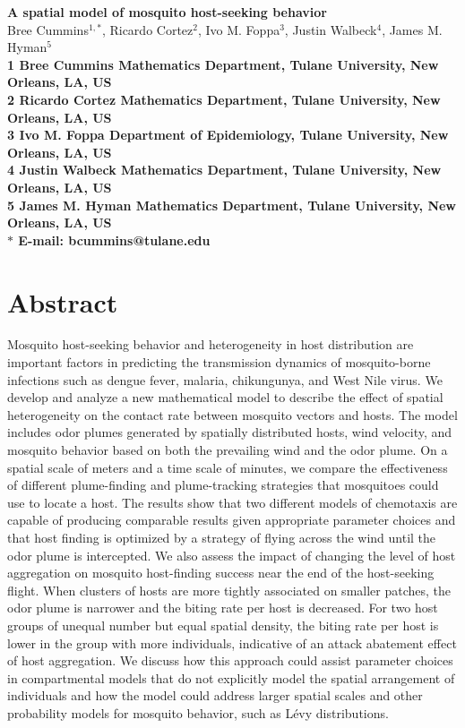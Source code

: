 \documentclass[10pt]{article}
\date{}
\begin{document}
\begin{flushleft}
{\Large
\textbf{A spatial model of mosquito host-seeking behavior}
}
\\
Bree Cummins$^{1,\ast}$,
Ricardo Cortez$^{2}$,
Ivo M. Foppa$^{3}$,
Justin Walbeck$^{4}$,
James M. Hyman$^{5}$
\\
\bf{1} Bree Cummins Mathematics Department, Tulane University, New Orleans, LA, US
\\
\bf{2} Ricardo Cortez Mathematics Department, Tulane University, New Orleans, LA, US
\\
\bf{3} Ivo M. Foppa Department of Epidemiology, Tulane University, New Orleans, LA, US
\\
\bf{4} Justin Walbeck Mathematics Department, Tulane University, New Orleans, LA, US
\\
\bf{5} James M. Hyman Mathematics Department, Tulane University, New Orleans, LA, US
\\
$\ast$ E-mail: bcummins@tulane.edu
\end{flushleft}


\section*{Abstract}
Mosquito host-seeking behavior and heterogeneity in host distribution are important factors
in predicting the transmission dynamics of mosquito-borne infections such as dengue fever, malaria, chikungunya, and West Nile virus. 
We develop and analyze a new mathematical model to describe the effect of spatial
heterogeneity on the contact rate between mosquito vectors and hosts. The model includes odor 
plumes generated by spatially distributed hosts, wind velocity,
and mosquito behavior based on both the prevailing wind and the odor plume.
On a spatial scale of meters and a time scale of minutes, we compare the effectiveness of different plume-finding and plume-tracking strategies that mosquitoes could use to locate a host. The results show that two different models of chemotaxis are capable of producing comparable results given appropriate parameter choices and that host finding is optimized by a strategy of flying across the wind until the odor plume is intercepted.  
We also assess the impact of changing the level of host aggregation on mosquito host-finding success near the end of the host-seeking flight.
When clusters of hosts are more tightly associated on smaller patches, the odor plume is narrower and the biting rate per host is decreased. For two host groups of unequal number but equal spatial density, the biting rate per host is lower in the group with more individuals, indicative of an attack abatement effect of host aggregation. 
We discuss how this approach could assist parameter choices in compartmental models that do not explicitly model the spatial arrangement of individuals and how the model could address larger spatial scales and other probability models for mosquito behavior, such as L\'{e}vy distributions.
\end{document}

